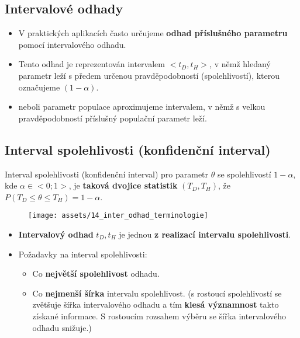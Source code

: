 \subsection{Intervalové odhady}
\begin{itemize}
    \item V praktických aplikacích často určujeme \textbf{odhad příslušného parametru} pomocí intervalového odhadu.
    \item Tento odhad je reprezentován intervalem $<t_D, t_H>$, v němž hledaný parametr leží s předem určenou pravděpodobností (spolehlivostí), kterou označujeme $(1 − \alpha)$.
    \item neboli parametr populace aproximujeme intervalem, v němž s velkou pravděpodobností příslušný populační parametr leží.
\end{itemize}

\subsection{Interval spolehlivosti (konfidenční interval)}
Interval spolehlivosti (konfidenční interval) pro parametr $\theta$ se spolehlivostí $1−\alpha$, kde $\alpha \in <0; 1>$, je \textbf{taková dvojice statistik} $(T_D, T_H)$, že $P(T_D \leq \theta \leq T_H) = 1 − \alpha$.
\begin{figure}[H]
    \centering
    \texttt{[image: assets/14\_inter\_odhad\_terminologie]}
\end{figure}
\begin{itemize}
    \item \textbf{Intervalový odhad} $t_D,t_H$ je jednou \textbf{z realizací intervalu spolehlivosti}.
    \item Požadavky na interval spolehlivosti:
          \begin{itemize}
              \item Co \textbf{největší spolehlivost} odhadu.
              \item Co \textbf{nejmenší šírka} intervalu spolehlivost. (s rostoucí spolehlivostí se zvětšuje šířka intervalového odhadu a tím \textbf{klesá významnost} takto získané informace. S rostoucím rozsahem výběru se šířka intervalového odhadu snižuje.)
          \end{itemize}
\end{itemize}
